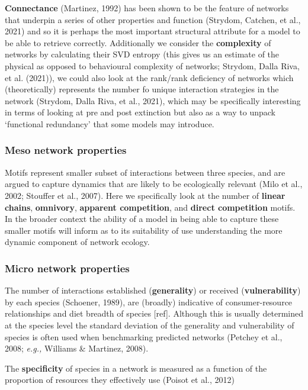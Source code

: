 \documentclass[
]{article}
\begin{document}
\textbf{Connectance} (Martinez, 1992) has been shown to be the feature
of networks that underpin a series of other properties and function
(Strydom, Catchen, et al., 2021) and so it is perhaps the most important
structural attribute for a model to be able to retrieve correctly.
Additionally we consider the \textbf{complexity} of networks by
calculating their SVD entropy (this gives us an estimate of the physical
as opposed to behavioural complexity of networks; Strydom, Dalla Riva,
et al. (2021)), we could also look at the rank/rank deficiency of
networks which (theoretically) represents the number fo unique
interaction strategies in the network (Strydom, Dalla Riva, et al.,
2021), which may be specifically interesting in terms of looking at pre
and post extinction but also as a way to unpack `functional redundancy'
that some models may introduce.

\subsubsection{Meso network properties}\label{meso-network-properties}

Motifs represent smaller subset of interactions between three species,
and are argued to capture dynamics that are likely to be ecologically
relevant (Milo et al., 2002; Stouffer et al., 2007). Here we
specifically look at the number of \textbf{linear chains},
\textbf{omnivory}, \textbf{apparent competition}, and \textbf{direct
competition} motifs. In the broader context the ability of a model in
being able to capture these smaller motifs will inform as to its
suitability of use understanding the more dynamic component of network
ecology.

\subsubsection{Micro network properties}\label{micro-network-properties}

The number of interactions established (\textbf{generality}) or received
(\textbf{vulnerability}) by each species (Schoener, 1989), are (broadly)
indicative of consumer-resource relationships and diet breadth of
species {[}ref{]}. Although this is usually determined at the species
level the standard deviation of the generality and vulnerability of
species is often used when benchmarking predicted networks (Petchey et
al., 2008; \emph{e.g.,} Williams \& Martinez, 2008).

The \textbf{specificity} of species in a network is measured as a
function of the proportion of resources they effectively use (Poisot et
al., 2012)
\end{document}
